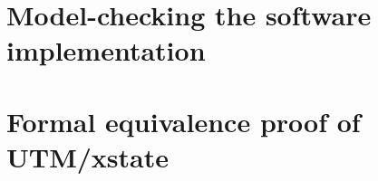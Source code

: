 \documentclass{phd-thesis}
\begin{document}
\chapter[Model-checking the implementation]{Model-checking the software implementation}


\chapter{Formal equivalence proof of UTM/xstate}\label{sec:hw-proof}


\backmatter

\printindex
\end{document}
